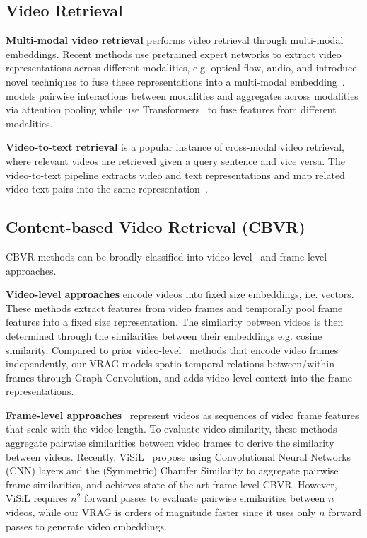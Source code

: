 \documentclass[letterpaper]{article} \usepackage{aaai22}  \usepackage{times}  \usepackage{helvet}  \usepackage{courier}  \usepackage[hyphens]{url}  \usepackage{graphicx} \urlstyle{rm} \usepackage{amsmath}
\begin{document}
\subsection{Video Retrieval}

\textbf{Multi-modal video retrieval} performs video retrieval through multi-modal embeddings. Recent methods use pretrained expert networks to extract video representations across different modalities, e.g. optical flow, audio, and introduce novel techniques to fuse these representations into a multi-modal embedding~\cite{collaborative-experts, moEE, mm-transformer}. \cite{collaborative-experts} models pairwise interactions between modalities and aggregates across modalities via attention pooling while \cite{mm-transformer} use Transformers~\cite{attention-is-all-you-need} to fuse features from different modalities.

\textbf{Video-to-text retrieval} is a popular instance of cross-modal video retrieval, where relevant videos are retrieved given a query sentence and vice versa. The video-to-text pipeline extracts video and text representations and map related video-text pairs into the same representation~\cite{collaborative-experts, howto100m}.

\subsection{Content-based Video Retrieval (CBVR)}
CBVR methods can be broadly classified into video-level~\cite{baseline:tmk, Baraldi2018LAMVLT, kordopatis2017dml, lbow} and frame-level~\cite{temporal_network, baseline:dp, kordopatiszilos2019visil} approaches.

\textbf{Video-level approaches} encode videos into fixed size embeddings, i.e.  vectors. These methods extract features from video frames and temporally pool frame features into a fixed size representation. The similarity between videos is then determined through the similarities between their embeddings e.g. cosine similarity. Compared to prior video-level~\cite{kordopatis2017dml, lbow, baseline:tmk, Baraldi2018LAMVLT} methods that encode video frames independently, our VRAG models spatio-temporal relations between/within frames through Graph Convolution, and adds video-level context into the frame representations.

\textbf{Frame-level approaches}~\cite{temporal_network, baseline:dp} represent videos as sequences of video frame features that scale with the video length. To evaluate video similarity, these methods aggregate pairwise similarities between video frames to derive the similarity between videos. Recently, ViSiL~\cite{kordopatiszilos2019visil} propose using Convolutional Neural Networks (CNN) layers and the (Symmetric) Chamfer Similarity to aggregate pairwise frame similarities, and achieves state-of-the-art frame-level CBVR. However, ViSiL requires $n^2$ forward passes to evaluate pairwise similarities between $n$ videos, while our VRAG is orders of magnitude faster since it uses only $n$ forward passes to generate video embeddings.
\end{document}
